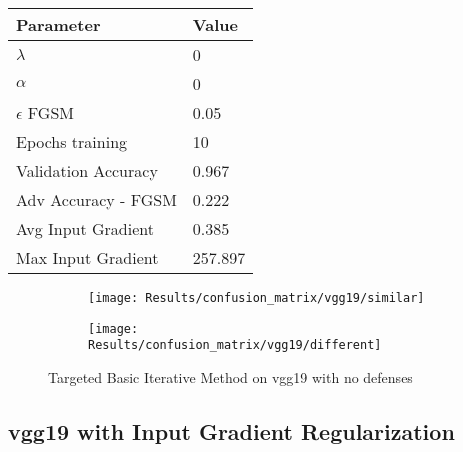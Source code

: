 \documentclass[draft,final]{vutinfth} %
\begin{document}
\begin{table}[h]
  \centering
  \begin{tabular}{ll}
    \toprule
			Parameter			& Value   \\
    \midrule
			$\lambda$								& 0				\\
			$\alpha$								& 0				\\
			$\epsilon$ FGSM					& 0.05		\\
			Epochs training					& 10			\\
			
			Validation Accuracy			& 0.967		\\ 
			Adv Accuracy - FGSM			& 0.222		\\
			
			Avg Input Gradient			& 0.385	\\
			Max Input Gradient			& 257.897\\
    \bottomrule
  \end{tabular}
\end{table}


\begin{figure}[h]
  \begin{subfigure}[b]{0.5\columnwidth}
		\centering
    \texttt{[image: Results/confusion\_matrix/vgg19/similar]}
    \label{fig:exp:cm:vgg19:similar}
  \end{subfigure}
  \begin{subfigure}[b]{0.5\columnwidth}
		\centering
    \texttt{[image: Results/confusion\_matrix/vgg19/different]}
    \label{fig:exp:cm:vgg19:different}
  \end{subfigure}
  \caption{Targeted Basic Iterative Method on vgg19 with no defenses}
  \label{fig:exp:cm:vgg19}
\end{figure}
\clearpage



\subsection{vgg19 with Input Gradient Regularization}
\end{document}
